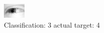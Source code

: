 \begin{figure}[h!]
\begin{center}
\includegraphics[width=0.60\columnwidth]{figures/ID2488_class_3_target_4.png}
\end{center}
\caption{ Classification: 3 actual target: 4}
\label{fig:ID2488_class_3_target_4}
\end{figure}
